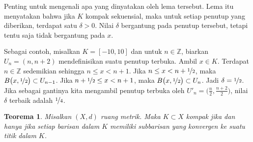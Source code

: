 \documentclass[12pt,openany]{book}
\newcommand{\Z}{{\mathbb{Z}}}
\theoremstyle{plain}
\newtheorem{thm}{Teorema}[section]
\theoremstyle{remark}
\theoremstyle{definition}
\theoremstyle{exercise}
\theoremstyle{example}
\begin{document}
Penting untuk mengenali apa yang dinyatakan oleh lema tersebut. Lema itu menyatakan bahwa
jika $K$ kompak sekuensial, maka untuk setiap penutup yang diberikan,
terdapat satu $\delta > 0$. Nilai $\delta$ bergantung pada penutup tersebut,
tetapi tentu saja tidak bergantung pada $x$.

Sebagai contoh, misalkan $K = [-10,10]$ dan untuk $n \in \Z$, biarkan $U_n =
(n,n+2)$ mendefinisikan suatu penutup terbuka.
Ambil $x \in K$. Terdapat $n \in \Z$
sedemikian sehingga $n \leq x < n+1$.
Jika $n \leq x < n+\nicefrac{1}{2}$, maka
$B\bigl(x,\nicefrac{1}{2}\bigr) \subset U_{n-1}$.
Jika $n+ \nicefrac{1}{2} \leq x < n+1$, maka
$B\bigl(x,\nicefrac{1}{2}\bigr) \subset U_{n}$. Jadi $\delta =
\nicefrac{1}{2}$. Jika sebagai gantinya kita mengambil penutup terbuka oleh $U'_n =
\bigl(\frac{n}{2},\frac{n+2}{2} \bigr)$, nilai $\delta$ terbaik adalah $\nicefrac{1}{4}$.

\begin{thm} \label{thm:mscompactisseqcpt}
Misalkan $(X,d)$ ruang metrik. Maka $K \subset X$ kompak jika
dan hanya jika setiap barisan dalam $K$ memiliki subbarisan yang konvergen ke
suatu titik dalam $K$.
\end{thm}
\end{document}
